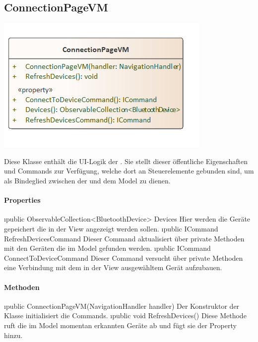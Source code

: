 \documentclass[../entwurf.tex]{subfiles}
\begin{document}
\subsection{ConnectionPageVM}
\begin{minipage}{0.5\textwidth}
\includegraphics[scale=0.75]{../graphics/vm_klassen/ConnectionPageVM.png}
\end{minipage}
\begin{minipage}{0.5\textwidth}
 \newline
Diese Klasse enthält die UI-Logik der . Sie stellt dieser öffentliche Eigenschaften und Commands zur Verfügung, welche dort an Steuerelemente gebunden sind, um als Bindeglied zwischen der  und dem Model zu dienen.
\end{minipage}
\paragraph{Properties}
\begin{itemize}
	\i{public ObservableCollection<BluetoothDevice> Devices} Hier werden die Geräte gepeichert die in der View angezeigt werden sollen. 
	\i{public ICommand RefreshDevicesCommand} Dieser Command aktualisiert über private Methoden  mit den Geräten die im Model gefunden werden. 
	\i{public ICommand ConnectToDeviceCommand} Dieser Command versucht über private Methoden eine Verbindung mit dem in der View ausgewähltem Gerät aufzubauen. 
\end{itemize}
\paragraph{Methoden}
\begin{itemize}
	\i{public ConnectionPageVM(NavigationHandler handler)} Der Konstruktor der Klasse initialisiert die Commands.
	\i{public void RefreshDevices()} Diese Methode ruft die im Model momentan erkannten Geräte ab und fügt sie der Property  hinzu.
\end{itemize}
\end{document}
